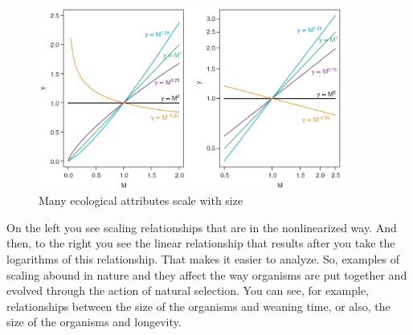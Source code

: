 \documentclass[]{article}
\begin{document}
\begin{figure}[H]
	\caption[Many ecological attributes scale with size]{Many ecological attributes scale with size\cite{white2012methodological}}\label{fig:PowerLawScaling}
	\includegraphics[width=0.9\textwidth]{PowerLawScaling}
\end{figure}

On the left you see scaling relationships that are in the nonlinearized way. And then, to the right you see the linear relationship that results after you take the logarithms
of this relationship.
That makes it easier to analyze.
So, examples of scaling abound in nature
and they affect the way organisms
are put together and evolved
through the action of natural selection.
You can see, for example,
relationships between
the size of the organisms
and weaning time,
or also, the size of the organisms
and longevity.
\end{document}
